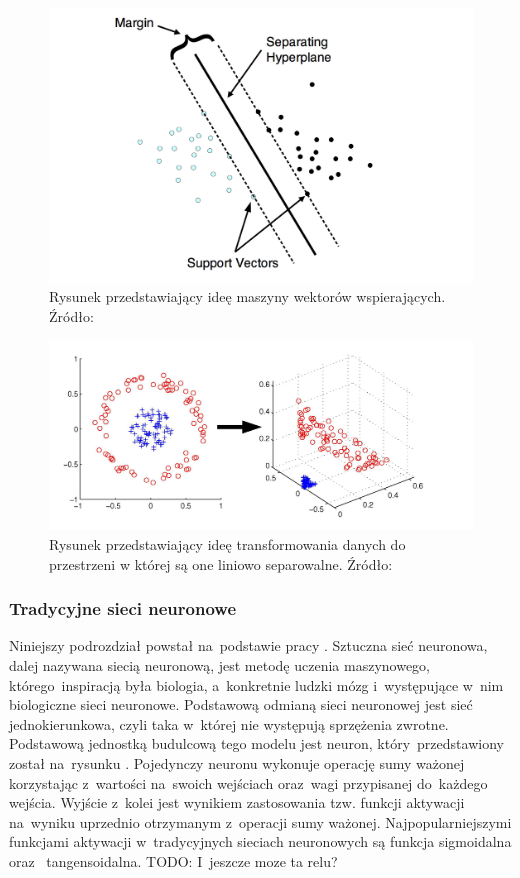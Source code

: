 \begin{figure}[ht!]
\centering
\includegraphics[scale=0.8]{res/svm1.png}
\caption[Caption for LOF]{Rysunek przedstawiający ideę maszyny wektorów wspierających. Źródło:\cite{svm2} \label{svmIdea}}
\end{figure} 

\begin{figure}[ht!]
\centering
\includegraphics[scale=0.6]{res/svm2.png}
\caption[Caption for LOF]{Rysunek przedstawiający ideę transformowania danych do przestrzeni w której są one liniowo separowalne. Źródło:\cite{svmKernel} \label{svmKernel}}
\end{figure} 

\subsubsection{Tradycyjne sieci neuronowe}
Niniejszy podrozdział powstał na~podstawie pracy \cite{tadeusiewicz}. Sztuczna sieć neuronowa, dalej nazywana siecią neuronową, jest metodę uczenia maszynowego, którego~inspiracją była biologia, a~konkretnie ludzki mózg i~występujące w~nim biologiczne sieci neuronowe. Podstawową odmianą sieci neuronowej jest sieć jednokierunkowa, czyli taka w~której nie występują sprzężenia zwrotne. Podstawową jednostką budulcową tego modelu jest neuron, który~przedstawiony został na~rysunku \label{neuron}. Pojedynczy neuronu wykonuje operację sumy ważonej korzystając z~wartości na~swoich wejściach oraz~wagi przypisanej do~każdego wejścia. Wyjście z~kolei jest wynikiem zastosowania tzw. funkcji aktywacji na~wyniku uprzednio otrzymanym z~operacji sumy ważonej. Najpopularniejszymi funkcjami aktywacji w~tradycyjnych sieciach neuronowych są funkcja sigmoidalna oraz~ tangensoidalna. TODO: I~jeszcze moze ta relu?
 
